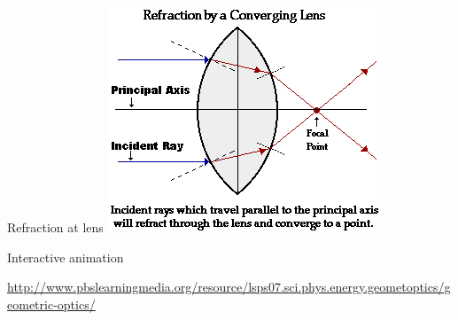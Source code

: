 \begin{frame}{Refraction at lens}
  \includegraphics[height=0.8\textheight]{media/convexlens.png}
\end{frame}

\begin{frame}{Interactive animation}

  \url{http://www.pbslearningmedia.org/resource/lsps07.sci.phys.energy.geometoptics/geometric-optics/}

\end{frame}


